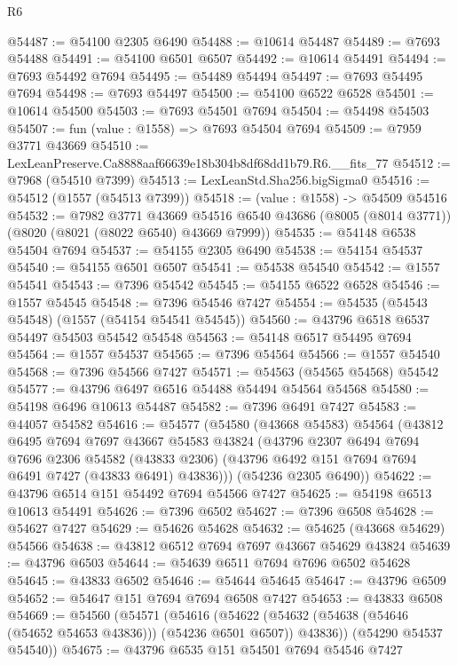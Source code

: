 \begin{lexlean}{R6}
\begin{coremodule}
@54487 := @54100 @2305 @6490
@54488 := @10614 @54487
@54489 := @7693 @54488
@54491 := @54100 @6501 @6507
@54492 := @10614 @54491
@54494 := @7693 @54492 @7694
@54495 := @54489 @54494
@54497 := @7693 @54495 @7694
@54498 := @7693 @54497
@54500 := @54100 @6522 @6528
@54501 := @10614 @54500
@54503 := @7693 @54501 @7694
@54504 := @54498 @54503
@54507 := fun (value : @1558) => @7693 @54504 @7694
@54509 := @7959 @3771 @43669
@54510 := LexLeanPreserve.Ca8888aaf66639e18b304b8df68dd1b79.R6.__fits_77
@54512 := @7968 (@54510 @7399)
@54513 := LexLeanStd.Sha256.bigSigma0
@54516 := @54512 (@1557 (@54513 @7399))
@54518 := (value : @1558) -> @54509 @54516
@54532 := @7982
    @3771
    @43669
    @54516
    @6540
    @43686
    (@8005 (@8014 @3771))
    (@8020 (@8021 (@8022 @6540) @43669 @7999))
@54535 := @54148 @6538 @54504 @7694
@54537 := @54155 @2305 @6490
@54538 := @54154 @54537
@54540 := @54155 @6501 @6507
@54541 := @54538 @54540
@54542 := @1557 @54541
@54543 := @7396 @54542
@54545 := @54155 @6522 @6528
@54546 := @1557 @54545
@54548 := @7396 @54546 @7427
@54554 := @54535 (@54543 @54548) (@1557 (@54154 @54541 @54545))
@54560 := @43796 @6518 @6537 @54497 @54503 @54542 @54548
@54563 := @54148 @6517 @54495 @7694
@54564 := @1557 @54537
@54565 := @7396 @54564
@54566 := @1557 @54540
@54568 := @7396 @54566 @7427
@54571 := @54563 (@54565 @54568) @54542
@54577 := @43796 @6497 @6516 @54488 @54494 @54564 @54568
@54580 := @54198 @6496 @10613 @54487
@54582 := @7396 @6491 @7427
@54583 := @44057 @54582
@54616 := @54577
    (@54580
      (@43668 @54583)
      @54564
      (@43812
        @6495
        @7694
        @7697
        @43667
        @54583
        @43824
        (@43796
          @2307
          @6494
          @7694
          @7696
          @2306
          @54582
          (@43833 @2306)
          (@43796 @6492 @151 @7694 @7694 @6491 @7427 (@43833 @6491) @43836)))
      (@54236 @2305 @6490))
@54622 := @43796 @6514 @151 @54492 @7694 @54566 @7427
@54625 := @54198 @6513 @10613 @54491
@54626 := @7396 @6502
@54627 := @7396 @6508
@54628 := @54627 @7427
@54629 := @54626 @54628
@54632 := @54625 (@43668 @54629) @54566
@54638 := @43812 @6512 @7694 @7697 @43667 @54629 @43824
@54639 := @43796 @6503
@54644 := @54639 @6511 @7694 @7696 @6502 @54628
@54645 := @43833 @6502
@54646 := @54644 @54645
@54647 := @43796 @6509
@54652 := @54647 @151 @7694 @7694 @6508 @7427
@54653 := @43833 @6508
@54669 := @54560
    (@54571
      (@54616
        (@54622 (@54632 (@54638 (@54646 (@54652 @54653 @43836))) (@54236 @6501 @6507)) @43836))
      (@54290 @54537 @54540))
@54675 := @43796 @6535 @151 @54501 @7694 @54546 @7427

\end{coremodule}
\end{lexlean}
